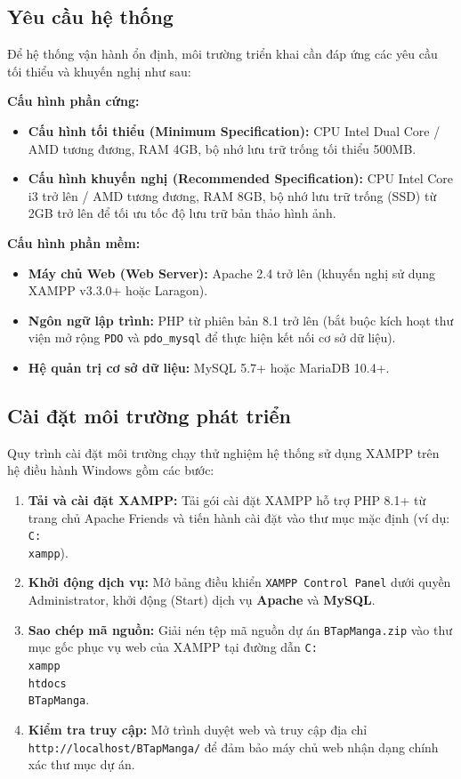\subsection{Yêu cầu hệ thống}
\label{subsec:install_sys_requirements}
Để hệ thống vận hành ổn định, môi trường triển khai cần đáp ứng các yêu cầu tối thiểu và khuyến nghị như sau:

\textbf{Cấu hình phần cứng:}
\begin{itemize}
    \item \textbf{Cấu hình tối thiểu (Minimum Specification):} CPU Intel Dual Core / AMD tương đương, RAM 4GB, bộ nhớ lưu trữ trống tối thiểu 500MB.
    \item \textbf{Cấu hình khuyến nghị (Recommended Specification):} CPU Intel Core i3 trở lên / AMD tương đương, RAM 8GB, bộ nhớ lưu trữ trống (SSD) từ 2GB trở lên để tối ưu tốc độ lưu trữ bản thảo hình ảnh.
\end{itemize}

\textbf{Cấu hình phần mềm:}
\begin{itemize}
    \item \textbf{Máy chủ Web (Web Server):} Apache 2.4 trở lên (khuyến nghị sử dụng XAMPP v3.3.0+ hoặc Laragon).
    \item \textbf{Ngôn ngữ lập trình:} PHP từ phiên bản 8.1 trở lên (bắt buộc kích hoạt thư viện mở rộng \texttt{PDO} và \texttt{pdo\_mysql} để thực hiện kết nối cơ sở dữ liệu).
    \item \textbf{Hệ quản trị cơ sở dữ liệu:} MySQL 5.7+ hoặc MariaDB 10.4+.
\end{itemize}

\subsection{Cài đặt môi trường phát triển}
\label{subsec:install_dev_environment}
Quy trình cài đặt môi trường chạy thử nghiệm hệ thống sử dụng XAMPP trên hệ điều hành Windows gồm các bước:
\begin{enumerate}
    \item \textbf{Tải và cài đặt XAMPP:} Tải gói cài đặt XAMPP hỗ trợ PHP 8.1+ từ trang chủ Apache Friends và tiến hành cài đặt vào thư mục mặc định (ví dụ: \texttt{C:\\xampp}).
    \item \textbf{Khởi động dịch vụ:} Mở bảng điều khiển \texttt{XAMPP Control Panel} dưới quyền Administrator, khởi động (Start) dịch vụ \textbf{Apache} và \textbf{MySQL}.
    \item \textbf{Sao chép mã nguồn:} Giải nén tệp mã nguồn dự án \texttt{BTapManga.zip} vào thư mục gốc phục vụ web của XAMPP tại đường dẫn \texttt{C:\\xampp\\htdocs\\BTapManga}.
    \item \textbf{Kiểm tra truy cập:} Mở trình duyệt web và truy cập địa chỉ \texttt{http://\allowbreak localhost/\allowbreak BTapManga/} để đảm bảo máy chủ web nhận dạng chính xác thư mục dự án.
\end{enumerate}

